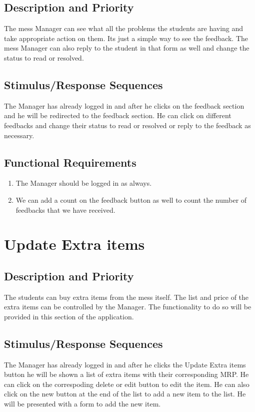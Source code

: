 \documentclass{scrreprt}
\begin{document}
\subsection{Description and Priority}
The mess Manager can see what all the problems the students are having and take appropriate action on them. Its just a simple way to see the feedback. The mess Manager can also reply to the student in that form as well and change the status to read or resolved.

\subsection{Stimulus/Response Sequences}
The Manager has already logged in and after he clicks on the feedback section and he will be redirected to the feedback section. He can click on different feedbacks and change their status to read or resolved or reply to the feedback as necessary.

\subsection{Functional Requirements}
\begin{enumerate}
    \item The Manager should be logged in as always.
    \item We can add a count on the feedback button as well to count the number of feedbacks that we have received.
\end{enumerate}

\section{Update Extra items}

\subsection{Description and Priority}
The students can buy extra items from the mess itself. The list and price of the extra items can be controlled by the Manager. The functionality to do so will be provided in this section of the application.

\subsection{Stimulus/Response Sequences}
The Manager has already logged in and after he clicks the Update Extra items button he will be shown a list of extra items with their corresponding MRP. He can click on the correspoding delete or edit button to edit the item. He can also click on the new button at the end of the list to add a new item to the list. He will be presented with a form to add the new item.
\end{document}
